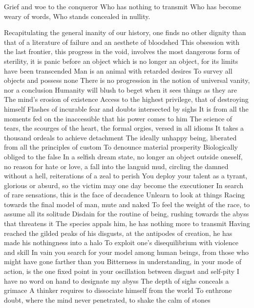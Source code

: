 \documentclass{article}
\newenvironment{stanza}{\begin{minipage}{10cm}\begin{internallinenumbers}\obeylines}{\end{internallinenumbers}\end{minipage}\vspace{\baselineskip}}
\begin{document}
\begin{stanza}
Grief and woe to the conqueror
Who has nothing to transmit
Who has become weary of words,
Who stands concealed in nullity.
\end{stanza}

\iffalse
Recapitulating the general inanity of our history, one finds no other dignity than that of a literature of failure and an aesthete of bloodshed
This obsession with the last frontier, this progress in the void, involves the most dangerous form of sterility, it is panic before an object which is no longer an object, for its limits have been transcended
Man is an animal with retarded desires
To survey all objects and possess none
There is no progression in the notion of universal vanity, nor a conclusion
Humanity will blush to beget when it sees things as they are
The mind's erosion of existence
Access to the highest privilege, that of destroying himself
Flashes of incurable fear and doubts intersected by sighs
It is from all the moments fed on the inaccessible that his power comes to him
The science of tears, the scourges of the heart, the formal orgies, versed in all idioms
It takes a thousand ordeals to achieve detachment
The ideally unhappy being, liberated from all the principles of custom
To denounce material prosperity
Biologically obliged to the false
In a selfish dream state, no longer an object outside oneself, no reason for hate or love, a fall into the languid mud, circling the damned without a hell, reiterations of a zeal to perish
You deploy your talent as a tyrant, glorious or absurd, so the victim may one day become the executioner
In search of rare sensations, this is the face of decadence
Unlearn to look at things
Racing towards the final model of man, mute and naked
To feel the weight of the race, to assume all its solitude
Disdain for the routine of being, rushing towards the abyss that threatens it
The species appals him, he has nothing more to transmit
Having reached the gilded peaks of his disgusts, at the antipodes of creation, he has made his nothingness into a halo
To exploit one's disequilibrium with violence and skill
In vain you search for your model among human beings, from those who might have gone farther than you
Bitterness in understanding, in your mode of action, is the one fixed point in your oscillation between disgust and self-pity
I have no word on hand to designate my abyss
The depth of sighs conceals a grimace
A thinker requires to dissociate himself from the world
To enthrone doubt, where the mind never penetrated, to shake the calm of stones
\end{document}
